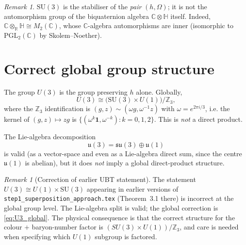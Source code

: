 \documentclass[12pt,a4paper]{article}
\theoremstyle{definition}
\theoremstyle{remark}
\newtheorem{remark}[theorem]{Remark}
\begin{document}
\begin{remark}\label{rem:su3_not_automorphism}
$\mathrm{SU}(3)$ is the stabiliser of the \emph{pair} $(h,\Omega)$; it is
not the automorphism group of the biquaternion algebra
$\mathbb{C}\otimes\mathbb{H}$ itself.  Indeed,
$\mathbb{C}\otimes_{\mathbb{R}}\mathbb{H}\cong M_2(\mathbb{C})$, whose
$\mathbb{C}$-algebra automorphisms are inner (isomorphic to
$\mathrm{PGL}_2(\mathbb{C})$ by Skolem--Noether).
\end{remark}

\section{Correct global group structure}
\label{sec:global_group}

The group $U(3)$ is the group preserving $h$ alone.
Globally,
\begin{equation}\label{eq:U3_global}
  U(3) \cong \bigl(\mathrm{SU}(3)\times U(1)\bigr)/\mathbb{Z}_3,
\end{equation}
where the $\mathbb{Z}_3$ identification is
$(g,z)\sim(\omega g,\omega^{-1}z)$ with
$\omega=e^{2\pi i/3}$, i.e. the kernel of
$(g,z)\mapsto zg$ is $\{(\omega^k\mathbf 1,\omega^{-k}):k=0,1,2\}$.
This is \emph{not} a direct product.

The Lie-algebra decomposition
\begin{equation}
  \mathfrak{u}(3) = \mathfrak{su}(3)\oplus\mathfrak{u}(1)
\end{equation}
is valid (as a vector-space and even as a Lie-algebra direct sum, since the
centre $\mathfrak{u}(1)$ is abelian), but it does \emph{not} imply a global
direct-product structure.

\begin{remark}[Correction of earlier UBT statement]
The statement $U(3)\cong U(1)\times\mathrm{SU}(3)$ appearing in earlier
versions of \texttt{step1\_superposition\_approach.tex} (Theorem~3.1 there) is
incorrect at the global group level.  The Lie-algebra split is valid; the global
correction is \eqref{eq:U3_global}.  The physical consequence is that the
correct structure for the colour $+$ baryon-number factor is
$(SU(3)\times U(1))/\mathbb{Z}_3$, and care is needed when specifying which
$U(1)$ subgroup is factored.
\end{remark}

\end{document}
